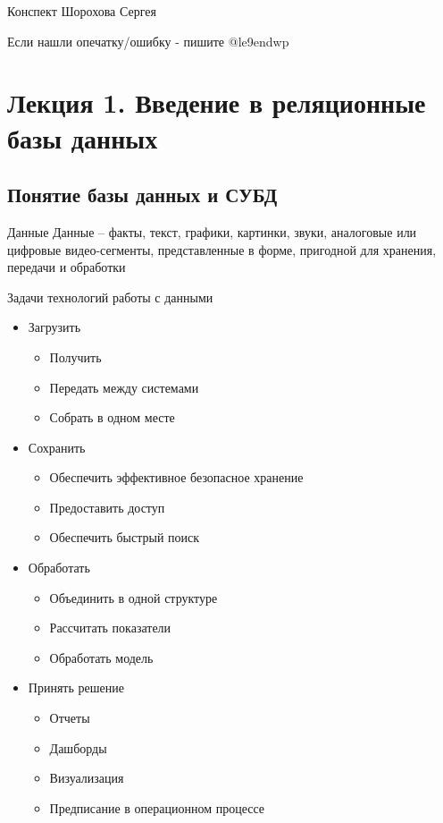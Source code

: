\documentclass[12pt]{article}
\begin{document}
\begin{flushright}
    Конспект Шорохова Сергея

    Если нашли опечатку/ошибку - пишите @le9endwp 
\end{flushright}

\tableofcontents
\newpage

\section{Лекция 1. Введение в реляционные базы данных}

\subsection{Понятие базы данных и СУБД}

\begin{defin}{Данные}
    Данные -- факты, текст, графики, картинки, звуки, аналоговые или цифровые видео-сегменты, представленные в форме, пригодной для хранения,  передачи и обработки
\end{defin}

\begin{nota}{Задачи технологий работы с данными}
    \begin{itemize}
        \item Загрузить 
        \begin{itemize}
            \item Получить
            \item Передать между системами
            \item Собрать в одном месте
        \end{itemize}
        \item Сохранить 
        \begin{itemize}
            \item Обеспечить эффективное безопасное хранение
            \item Предоставить доступ
            \item Обеспечить быстрый поиск
        \end{itemize}
        \item Обработать
        \begin{itemize}
            \item Объединить в одной структуре
            \item Рассчитать показатели
            \item Обработать модель
        \end{itemize}
        \item Принять решение
        \begin{itemize}
            \item Отчеты
            \item Дашборды
            \item Визуализация
            \item Предписание в операционном процессе
        \end{itemize}
    \end{itemize}
\end{nota}
\end{document}
